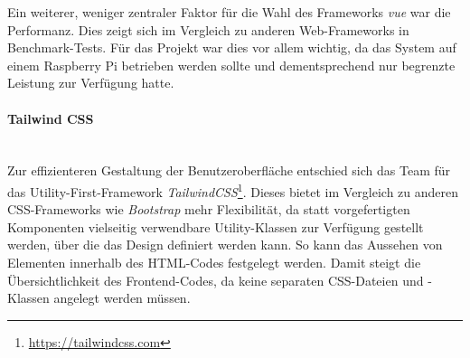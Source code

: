 \documentclass[10pt, a4paper]{article}
\begin{document}
Ein weiterer, weniger zentraler Faktor für die Wahl des Frameworks \textit{vue} war die Performanz.
Dies zeigt sich im Vergleich zu anderen Web-Frameworks in Benchmark-Tests.\cite{Vue_Performance}
Für das Projekt war dies vor allem wichtig, da das System auf einem Raspberry Pi betrieben werden sollte
 und dementsprechend nur begrenzte Leistung zur Verfügung hatte.

\paragraph*{Tailwind CSS} $~$ \\
Zur effizienteren Gestaltung der Benutzeroberfläche entschied sich das Team für das Utility-First-Framework \textit{TailwindCSS}\footnote{\raggedright\url{https://tailwindcss.com}}.
Dieses bietet im Vergleich zu anderen CSS-Frameworks wie \textit{Bootstrap} mehr Flexibilität, da statt vorgefertigten Komponenten vielseitig verwendbare Utility-Klassen zur Verfügung gestellt werden,
über die das Design definiert werden kann. So kann das Aussehen von Elementen innerhalb des HTML-Codes festgelegt werden.
Damit steigt die Übersichtlichkeit des Frontend-Codes, da keine separaten CSS-Dateien und -Klassen angelegt werden müssen.
\cite{Tailwind_Vorteile}
\end{document}
